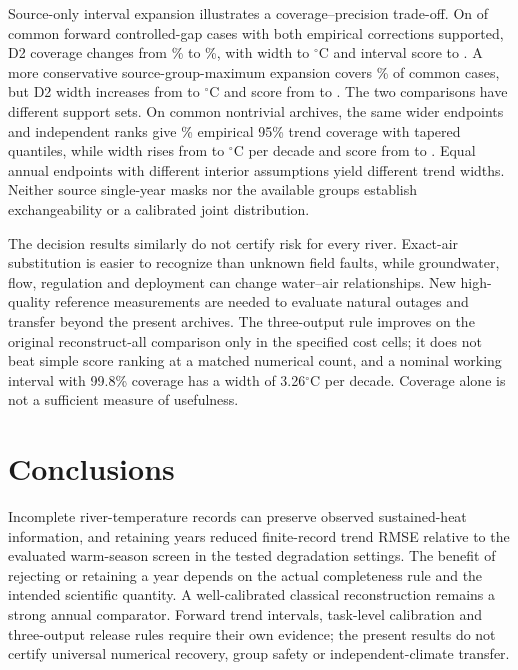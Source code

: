 \documentclass[draft,linenumbers]{agujournal2025}
\begin{document}
Source-only interval expansion illustrates a coverage--precision trade-off. On \SYAllSupported{} of \SYAllEligible{} common forward controlled-gap cases with both empirical corrections supported, D2 coverage changes from \SYDTwoBase\% to \SYDTwoExpanded\%, with width \SYDTwoWidthBase{} to \SYDTwoWidthExpanded{} $^{\circ}$C and interval score \SYDTwoScoreBase{} to \SYDTwoScoreExpanded{}. A more conservative source-group-maximum expansion covers \GMAnnualDNew\% of \GMAnnualCases{} common cases, but D2 width increases from \GMAnnualDWidthBase{} to \GMAnnualDWidthNew{} $^{\circ}$C and score from \GMAnnualDScoreBase{} to \GMAnnualDScoreNew{}. The two comparisons have different support sets. On \GMTrendCases{} common nontrivial archives, the same wider endpoints and independent ranks give \GMTrendDNewCov\% empirical 95\% trend coverage with tapered quantiles, while width rises from \GMTrendDBaseWidth{} to \GMTrendDTaperWidth{} $^{\circ}$C per decade and score from \GMTrendDBaseScore{} to \GMTrendDNewScore{}. Equal annual endpoints with different interior assumptions yield different trend widths. Neither source single-year masks nor the available groups establish exchangeability or a calibrated joint distribution.

The decision results similarly do not certify risk for every river. Exact-air substitution is easier to recognize than unknown field faults, while groundwater, flow, regulation and deployment can change water--air relationships. New high-quality reference measurements are needed to evaluate natural outages and transfer beyond the present archives. The three-output rule improves on the original reconstruct-all comparison only in the specified cost cells; it does not beat simple score ranking at a matched numerical count, and a nominal working interval with 99.8\% coverage has a width of 3.26$^{\circ}$C per decade. Coverage alone is not a sufficient measure of usefulness.

\section{Conclusions}
Incomplete river-temperature records can preserve observed sustained-heat information, and retaining years reduced finite-record trend RMSE relative to the evaluated warm-season screen in the tested degradation settings. The benefit of rejecting or retaining a year depends on the actual completeness rule and the intended scientific quantity. A well-calibrated classical reconstruction remains a strong annual comparator. Forward trend intervals, task-level calibration and three-output release rules require their own evidence; the present results do not certify universal numerical recovery, group safety or independent-climate transfer.
\end{document}

